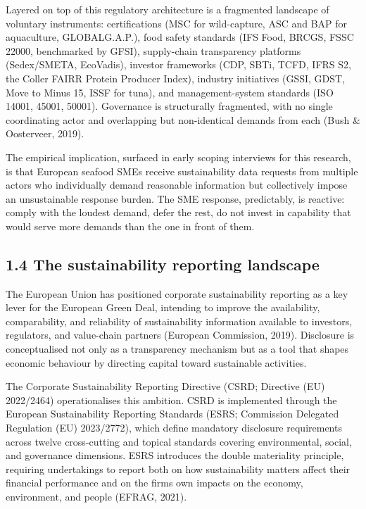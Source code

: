 \documentclass[
]{article}
\begin{document}
Layered on top of this regulatory architecture is a fragmented landscape
of voluntary instruments: certifications (MSC for wild-capture, ASC and
BAP for aquaculture, GLOBALG.A.P.), food safety standards (IFS Food,
BRCGS, FSSC 22000, benchmarked by GFSI), supply-chain transparency
platforms (Sedex/SMETA, EcoVadis), investor frameworks (CDP, SBTi, TCFD,
IFRS S2, the Coller FAIRR Protein Producer Index), industry initiatives
(GSSI, GDST, Move to Minus 15, ISSF for tuna), and management-system
standards (ISO 14001, 45001, 50001). Governance is structurally
fragmented, with no single coordinating actor and overlapping but
non-identical demands from each (Bush \& Oosterveer, 2019).

The empirical implication, surfaced in early scoping interviews for this
research, is that European seafood SMEs receive sustainability data
requests from multiple actors who individually demand reasonable
information but collectively impose an unsustainable response burden.
The SME response, predictably, is reactive: comply with the loudest
demand, defer the rest, do not invest in capability that would serve
more demands than the one in front of them.

\subsection{1.4 The sustainability reporting
landscape}\label{the-sustainability-reporting-landscape}

The European Union has positioned corporate sustainability reporting as
a key lever for the European Green Deal, intending to improve the
availability, comparability, and reliability of sustainability
information available to investors, regulators, and value-chain partners
(European Commission, 2019). Disclosure is conceptualised not only as a
transparency mechanism but as a tool that shapes economic behaviour by
directing capital toward sustainable activities.

The Corporate Sustainability Reporting Directive (CSRD; Directive (EU)
2022/2464) operationalises this ambition. CSRD is implemented through
the European Sustainability Reporting Standards (ESRS; Commission
Delegated Regulation (EU) 2023/2772), which define mandatory disclosure
requirements across twelve cross-cutting and topical standards covering
environmental, social, and governance dimensions. ESRS introduces the
double materiality principle, requiring undertakings to report both on
how sustainability matters affect their financial performance and on the
firm\textquotesingle s own impacts on the economy, environment, and
people (EFRAG, 2021).
\end{document}
